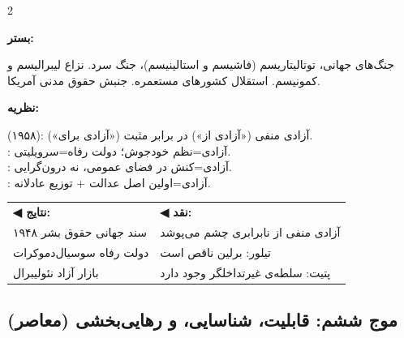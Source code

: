 \begin{tcolorbox}[mybox, title={موج پنجم | قرن بیستم | \lr{1914 -- 1990}},
  colframe=EraContemp, colback=EraContemp!5,
  boxed title style={colback=EraContemp}]

\begin{multicols}{2}

\textbf{\color{EraContemp}بستر:}

جنگ‌های جهانی، توتالیتاریسم (فاشیسم و استالینیسم)، جنگ سرد. نزاع لیبرالیسم و کمونیسم. استقلال کشورهای مستعمره. جنبش حقوق مدنی آمریکا.

\columnbreak

\textbf{\color{EraContemp}نظریه:}

 (۱۹۵۸): آزادی منفی («آزادی از») در برابر مثبت («آزادی برای»).\\
: آزادی=نظم خودجوش؛ دولت رفاه=سرویلیتی.\\
: آزادی=کنش در فضای عمومی، نه درون‌گرایی.\\
: آزادی=اولین اصل عدالت + توزیع عادلانه.

\end{multicols}

\vspace{0.3cm}
\begin{tabular}{p{5cm}p{5cm}}
\textcolor{AccentGreen}{\textbf{◀ نتایج:}} & \textcolor{AccentRed}{\textbf{◀ نقد:}} \\
سند جهانی حقوق بشر ۱۹۴۸ & آزادی منفی از نابرابری چشم می‌پوشد \\
دولت رفاه سوسیال‌دموکرات & تیلور: برلین ناقص است \\
بازار آزاد نئولیبرال & پتیت: سلطه‌ی غیرتداخلگر وجود دارد \\
\end{tabular}

\end{tcolorbox}

\subsection{موج ششم: قابلیت، شناسایی، و رهایی‌بخشی (معاصر)}
\label{subsec:wave6}

